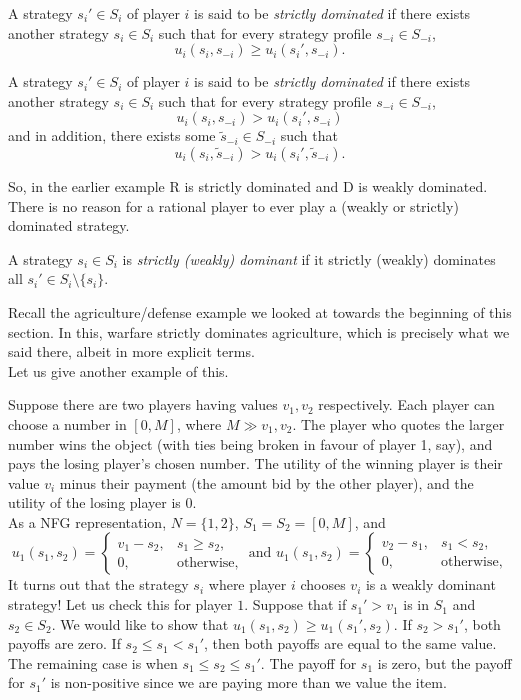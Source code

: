 	\begin{fdef}
		A strategy $s_i' \in S_i$ of player $i$ is said to be \emph{strictly dominated} if there exists another strategy $s_i \in S_i$ such that for every strategy profile $s_{-i} \in S_{-i}$,
		\[ u_i(s_i,s_{-i}) \ge u_i(s_i',s_{-i}). \]

		A strategy $s_i' \in S_i$ of player $i$ is said to be \emph{strictly dominated} if there exists another strategy $s_i \in S_i$ such that for every strategy profile $s_{-i} \in S_{-i}$,
		\[ u_i(s_i,s_{-i}) > u_i(s_i',s_{-i}) \]
		and in addition, there exists some $\tilde{s}_{-i} \in S_{-i}$ such that
		\[ u_i(s_i,\tilde{s}_{-i}) > u_i(s_i',\tilde{s}_{-i}). \]
	\end{fdef}
	So, in the earlier example R is strictly dominated and D is weakly dominated.\\
	There is no reason for a rational player to ever play a (weakly or strictly) dominated strategy.

	\begin{fdef}
		A strategy $s_i \in S_i$ is \emph{strictly (weakly) dominant} if it strictly (weakly) dominates all $s_i' \in S_i \setminus \{s_i\}$.
	\end{fdef}

	Recall the agriculture/defense example we looked at towards the beginning of this section. In this, warfare strictly dominates agriculture, which is precisely what we said there, albeit in more explicit terms.\\

	Let us give another example of this.

	\begin{fex}
		Suppose there are two players having values $v_1,v_2$ respectively. Each player can choose a number in $[0,M]$, where $M \gg v_1,v_2$. The player who quotes the larger number wins the object (with ties being broken in favour of player \textsf{1}, say), and pays the losing player's chosen number. The utility of the winning player is their value $v_i$ minus their payment (the amount bid by the other player), and the utility of the losing player is $0$.\\
		As a NFG representation, $N = \{1,2\}$, $S_1 = S_2 = [0,M]$, and
		\[ u_1(s_1,s_2) = \begin{cases} v_1 - s_2, & s_1 \ge s_2, \\ 0, & \text{otherwise,} \end{cases} \text{ and } u_1(s_1,s_2) = \begin{cases} v_2 - s_1, & s_1 < s_2, \\ 0, & \text{otherwise,} \end{cases} \]
		It turns out that the strategy $s_i$ where player $i$ chooses $v_i$ is a weakly dominant strategy! Let us check this for player $1$. Suppose that if $s_1' > v_1$ is in $S_1$ and $s_2 \in S_2$. We would like to show that $u_1(s_1,s_2) \ge u_1(s_1',s_2)$. If $s_2 > s_1'$, both payoffs are zero. If $s_2 \le s_1 < s_1'$, then both payoffs are equal to the same value. The remaining case is when $s_1 \le s_2 \le s_1'$. The payoff for $s_1$ is zero, but the payoff for $s_1'$ is non-positive since we are paying more than we value the item.
	\end{fex}

